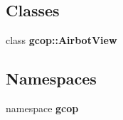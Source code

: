 \subsection*{\-Classes}
\begin{DoxyCompactItemize}
\item 
class {\bf gcop\-::\-Airbot\-View}
\end{DoxyCompactItemize}
\subsection*{\-Namespaces}
\begin{DoxyCompactItemize}
\item 
namespace {\bf gcop}
\end{DoxyCompactItemize}
